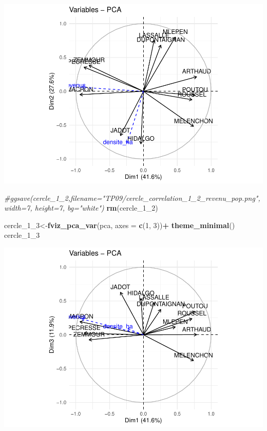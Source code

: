 \documentclass[
]{book}
\newenvironment{Shaded}{\begin{snugshade}}{\end{snugshade}}
\newcommand{\AttributeTok}[1]{\textcolor[rgb]{0.13,0.29,0.53}{#1}}
\newcommand{\CommentTok}[1]{\textcolor[rgb]{0.56,0.35,0.01}{\textit{#1}}}
\newcommand{\DecValTok}[1]{\textcolor[rgb]{0.00,0.00,0.81}{#1}}
\newcommand{\FunctionTok}[1]{\textcolor[rgb]{0.13,0.29,0.53}{\textbf{#1}}}
\newcommand{\NormalTok}[1]{#1}
\newcommand{\OtherTok}[1]{\textcolor[rgb]{0.56,0.35,0.01}{#1}}
\newcommand{\SpecialCharTok}[1]{\textcolor[rgb]{0.81,0.36,0.00}{\textbf{#1}}}
\begin{document}
\includegraphics{bookdown-demo_files/figure-latex/unnamed-chunk-85-1.pdf}

\begin{Shaded}
\begin{Highlighting}[]
\CommentTok{\#ggsave(cercle\_1\_2,filename="TP09/cercle\_correlation\_1\_2\_revenu\_pop.png", width=7, height=7, bg="white")}
\FunctionTok{rm}\NormalTok{(cercle\_1\_2)}


\NormalTok{cercle\_1\_3}\OtherTok{\textless{}{-}}\FunctionTok{fviz\_pca\_var}\NormalTok{(pca,  }\AttributeTok{axes =} \FunctionTok{c}\NormalTok{(}\DecValTok{1}\NormalTok{, }\DecValTok{3}\NormalTok{))}\SpecialCharTok{+}
  \FunctionTok{theme\_minimal}\NormalTok{()}
\NormalTok{cercle\_1\_3}
\end{Highlighting}
\end{Shaded}

\includegraphics{bookdown-demo_files/figure-latex/unnamed-chunk-85-2.pdf}
\end{document}
